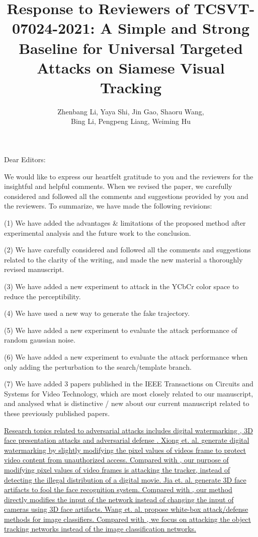 \documentclass[12pt]{article}
\begin{document}
\linespread{1}
\title{Response to Reviewers of TCSVT-07024-2021: A Simple and Strong Baseline for Universal Targeted Attacks on Siamese Visual Tracking}
\author{Zhenbang Li, Yaya Shi, Jin Gao, Shaoru Wang, \\Bing Li, Pengpeng Liang, Weiming Hu}
\date{}
\maketitle

\noindent Dear Editors:

We would like to express our heartfelt gratitude to you and the reviewers for the insightful and helpful comments. When we revised the paper, we carefully considered and followed all the comments and suggestions provided by you and the reviewers. To summarize, we have made the following revisions:

(1) We have added the advantages \& limitations of the proposed method after experimental analysis and the future work to the conclusion.

(2) We have carefully considered and followed all the comments and suggestions related to the clarity of the writing, and made the new material a thoroughly revised manuscript.

(3) We have added a new experiment to attack in the YCbCr color space to reduce the perceptibility.

(4) We have used a new way to generate the fake trajectory.

(5) We have added a new experiment to evaluate the attack performance of random gaussian noise.

(6) We have added a new experiment to evaluate the attack performance when only adding the perturbation to the search/template branch.

(7) We have added 3 papers published in the IEEE Transactions on Circuits and Systems for Video Technology, which are most closely related to our manuscript, and analysed what is distinctive / new about our current manuscript related to these previously published papers.

\uline{
Research topics related to adversarial attacks includes digital watermarking \cite{9343885}, 3D face presentation attacks \cite{9303455} and adversarial defense \cite{9169672}.
Xiong et. al. \cite{9343885} generate digital watermarking by slightly modifying the pixel values of videos frame to protect video content from unauthorized access. Compared with \cite{9343885}, our purpose of modifying pixel values of video frames is attacking the tracker, instead of detecting the illegal distribution of a digital movie.
Jia et. al. \cite{9294085} generate 3D face artifacts to fool the face recognition system. Compared with \cite{9294085}, our method directly modifies the input of the network instead of changing the input of cameras using 3D face artifacts.
Wang et. al. \cite{9169672} propose white-box attack/defense methods for image classifiers. Compared with \cite{9169672}, we focus on attacking the object tracking networks instead of the image classification networks.
}
\end{document}
